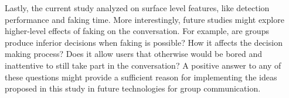 \documentclass[]{simple-thesis}
\begin{document}
Lastly, the current study analyzed on surface level features, like detection performance and faking time.
More interestingly, future studies might explore higher-level effects of faking on the conversation.
For example, are groups produce inferior decisions when faking is possible?
How it affects the decision making process?
Does it allow users that otherwise would be bored and inattentive to still take part in the conversation?
A positive answer to any of these questions might provide a sufficient reason for implementing the ideas proposed in this study in future technologies for group communication.


\cleardoublepage
{}
{}


\end{document}
